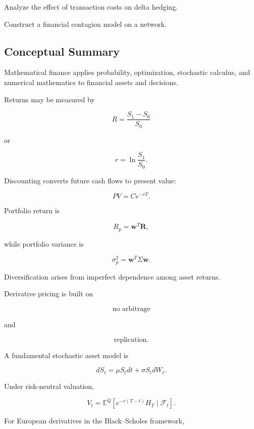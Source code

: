 \begin{exercise}[4]
Analyze the effect of transaction costs on delta hedging.
\end{exercise}

\begin{exercise}[4]
Construct a financial contagion model on a network.
\end{exercise}

\subsection{Conceptual Summary}
\label{subsec:mathematical-finance-summary}

Mathematical finance applies probability, optimization, stochastic calculus,
and numerical mathematics to financial assets and decisions.

Returns may be measured by

\[
\boxed{
R
=
\frac{S_1-S_0}{S_0}
}
\]

or

\[
\boxed{
r
=
\ln\frac{S_1}{S_0}.
}
\]

Discounting converts future cash flows to present value:

\[
\boxed{
PV
=
Ce^{-rT}.
}
\]

Portfolio return is

\[
\boxed{
R_p
=
\mathbf{w}^T\mathbf{R},
}
\]

while portfolio variance is

\[
\boxed{
\sigma_p^2
=
\mathbf{w}^T
\Sigma
\mathbf{w}.
}
\]

Diversification arises from imperfect dependence among asset returns.

Derivative pricing is built on

\[
\boxed{
\text{no arbitrage}
}
\]

and

\[
\boxed{
\text{replication}.
}
\]

A fundamental stochastic asset model is

\[
\boxed{
dS_t
=
\mu S_tdt
+
\sigma S_tdW_t.
}
\]

Under risk-neutral valuation,

\[
\boxed{
V_t
=
\mathbb{E}^{Q}
\left[
e^{-r(T-t)}
H_T
\mid
\mathcal{F}_t
\right].
}
\]

For European derivatives in the Black--Scholes framework,


